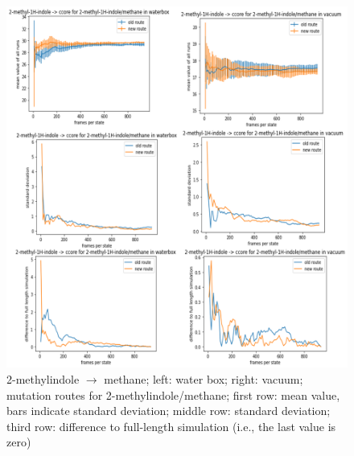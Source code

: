 \begin{figure}[!htb]
	
	\includegraphics[scale=0.9]{methylindole_short}\caption{2-methylindole $\mathrm{\rightarrow}$ methane; left: water box; right: vacuum; mutation routes for 2-methylindole/methane; first row: mean value, bars indicate standard deviation; middle row: standard deviation; third row: difference to full-length simulation (i.e., the last value is zero)}
	\label{fig:methylindole_short}
\end{figure}

